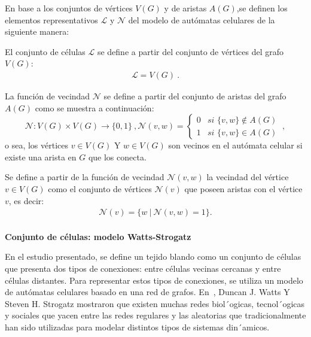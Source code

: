 \documentclass[a4paper,11pt]{article}
\begin{document}
{En base a los conjuntos de vértices $V(G)$ y de aristas $A(G)$,se definen los elementos representativos $\mathcal{L}$ y $\mathcal{N}$ del modelo de autómatas celulares de la siguiente manera:

El conjunto de c\'elulas $\mathcal{L}$ se define a partir del conjunto de v\'ertices del grafo  $V(G)$:
\begin{align}
\boxed{\mathcal{L} = V(G)}~. \label{eq-L}
\end{align}

La funci\'on de vecindad $\mathcal{N}$ se define a partir del conjunto de aristas del grafo $A(G)$ como se muestra a continuaci\'on:
\begin{subequations}
\begin{equation}
\boxed{\mathcal{N} : V(G) \times V(G) \rightarrow \lbrace 0,1 \rbrace}~, \label{eq-N}
\end{equation}
\begin{equation}
\boxed{\mathcal{N}(v,w) = \left\lbrace
	\begin{array}{lr}
		0& \textit{si } \lbrace v,w \rbrace \notin A(G)\\
		1& \textit{si } \lbrace v,w \rbrace \in A(G)
	\end{array}
\right.}~, \label{eq-N-2}
\end{equation}
\end{subequations}
o sea, los v\'ertices $v \in V(G)$ Y $w \in V(G)$  son vecinos en el aut\'omata celular si existe una arista en $G$ que los conecta.

Se define a partir de la funci\'on de vecindad $\mathcal{N}(v,w)$ la vecindad del v\'ertice $v \in V(G)$ como el conjunto de v\'ertices $\mathcal{N}(v)$ que poseen aristas con el v\'ertice $v$, es decir:
\begin{align} 
\mathcal{N}(v) = \lbrace w~|~\mathcal{N}(v,w)=1 \rbrace. \label{eq-neighbourhood}
\end{align}
\\
\textbf{Conjunto de c\'elulas: modelo Watts-Strogatz}

En el estudio presentado, se define un tejido blando como un conjunto de células que presenta dos tipos de conexiones: entre células vecinas cercanas y entre células distantes. Para representar estos tipos de conexiones, se utiliza un modelo de autómatas celulares basado en una red de grafos. En~\cite{9}, Duncan J. Watts Y Steven H. Strogatz mostraron que existen muchas redes biol´ogicas, tecnol´ogicas y sociales que yacen entre las redes regulares y las aleatorias que tradicionalmente han sido utilizadas para modelar distintos tipos de sistemas din´amicos.

}
\end{document}
